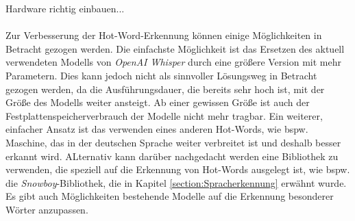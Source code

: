 Hardware richtig einbauen...\\\\
Zur Verbesserung der Hot-Word-Erkennung können einige Möglichkeiten in Betracht gezogen werden. Die einfachste Möglichkeit ist das Ersetzen des aktuell verwendeten Modells von \textit{OpenAI Whisper} durch eine größere Version mit mehr Parametern. Dies kann jedoch nicht als sinnvoller Lösungsweg in Betracht gezogen werden, da die Ausführungsdauer, die bereits sehr hoch ist, mit der Größe des Modells weiter ansteigt. Ab einer gewissen Größe ist auch der Festplattenspeicherverbrauch der Modelle nicht mehr tragbar. Ein weiterer, einfacher Ansatz ist das verwenden eines anderen Hot-Words, wie bspw. \glqq{}Maschine\grqq{}, das in der deutschen Sprache weiter verbreitet ist und deshalb besser erkannt wird. ALternativ kann darüber nachgedacht werden eine Bibliothek zu verwenden, die speziell auf die Erkennung von Hot-Words ausgelegt ist, wie bspw. die \textit{Snowboy}-Bibliothek, die in Kapitel \ref{section:Spracherkennung} erwähnt wurde. Es gibt auch Möglichkeiten bestehende Modelle auf die Erkennung besonderer Wörter anzupassen.



